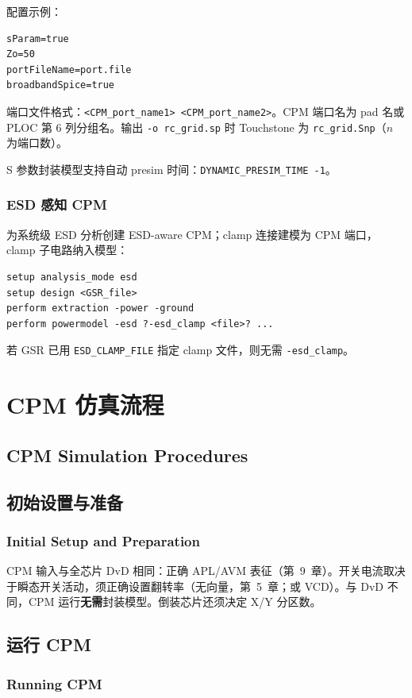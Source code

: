配置示例：
\begin{lstlisting}
sParam=true
Zo=50
portFileName=port.file
broadbandSpice=true
\end{lstlisting}

端口文件格式：\texttt{<CPM\_port\_name1> <CPM\_port\_name2>}。CPM 端口名为 pad 名或 PLOC 第 6 列分组名。输出 \texttt{-o rc\_grid.sp} 时 Touchstone 为 \texttt{rc\_grid.Snp}（$n$ 为端口数）。

S 参数封装模型支持自动 presim 时间：\texttt{DYNAMIC\_PRESIM\_TIME -1}。

\subsubsection{ESD 感知 CPM}
为系统级 ESD 分析创建 ESD-aware CPM；clamp 连接建模为 CPM 端口，clamp 子电路纳入模型：
\begin{lstlisting}
setup analysis_mode esd
setup design <GSR_file>
perform extraction -power -ground
perform powermodel -esd ?-esd_clamp <file>? ...
\end{lstlisting}
若 GSR 已用 \texttt{ESD\_CLAMP\_FILE} 指定 clamp 文件，则无需 \texttt{-esd\_clamp}。

\section{CPM 仿真流程}
\subsection*{CPM Simulation Procedures}

\subsection{初始设置与准备}
\subsubsection*{Initial Setup and Preparation}

CPM 输入与全芯片 DvD 相同：正确 APL/AVM 表征（第~9~章）。开关电流取决于瞬态开关活动，须正确设置翻转率（无向量，第~5~章；或 VCD）。与 DvD 不同，CPM 运行\textbf{无需}封装模型。倒装芯片还须决定 X/Y 分区数。

\subsection{运行 CPM}
\subsubsection*{Running CPM}

